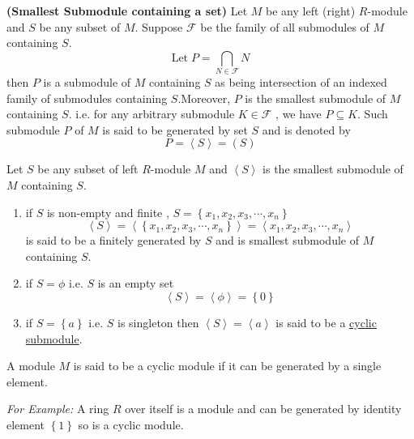 \begin{remark}\textbf{(Smallest Submodule containing a set)}\newline
	  		Let $M$ be any left (right) $R$-module and $S$ be any subset of $M$. Suppose $\mathcal{F}$ be the family of all submodules of $M$ containing $S$. \[  \text{Let} \; P=\bigcap_{N \in \mathcal{F}}N  \] then $P$ is a submodule of $M$ containing $S$ as being intersection of an indexed family of submodules containing $S$.\newline \bigskip Moreover, $P$ is the smallest submodule of $M$ containing $S$. i.e. for any arbitrary submodule $K \in \mathcal{F}$ , we have $ P \subseteq K$. Such submodule $P$ of $M$ is said to be generated by set $S$ and is denoted by \[ P = \left\langle S \right\rangle  = (S) \]
\end{remark}
\bigskip
\begin{remark}\qquad
	\begin{description}
	\item Let $S$ be any subset of left $R$-module $M$ and $\left\langle S \right\rangle $ is the smallest submodule of $M$ containing $S$.\newline
	\begin{enumerate}
		\item if $S$ is non-empty and finite , $S = \left\lbrace x_1,x_2,x_3, \cdots , x_n \right\rbrace $ \[ \left\langle S \right\rangle = \left\langle \left\lbrace x_1,x_2,x_3, \cdots , x_n \right\rbrace \right\rangle  = \left\langle x_1,x_2,x_3, \cdots , x_n \right\rangle \] is said to be a finitely generated by $S$ and is smallest submodule of $M$ containing $S$.
		\item if $S = \phi$ \quad i.e. $S$ is an empty set \[ \left\langle S \right\rangle = \left\langle \phi \right\rangle = \left\lbrace 0 \right\rbrace \]
		\item if $S = \left\lbrace a\right\rbrace $ \quad i.e. $S $ is singleton then $\left\langle S \right\rangle = \left\langle a\right\rangle $ is said to be a \underline{cyclic submodule}.
	\end{enumerate}
\end{description}
\end{remark}
\bigskip
\begin{definition}   \cite{Cohn2005}
	A module $M$ is said to be a cyclic module if it can be   generated by a single element.
\end{definition}
\textit{For Example:}
	A ring $R$ over itself is a module and can be generated by identity element $ \left\lbrace 1\right\rbrace $ so is a cyclic module.
